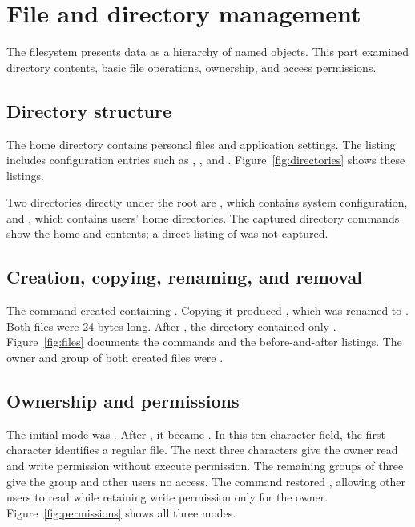 \documentclass{../latex/utmreport}
\begin{document}
\chapter{File and directory management}
The filesystem presents data as a hierarchy of named objects. This part
examined directory contents, basic file operations, ownership, and access
permissions.

\section{Directory structure}
The home directory contains personal files and application settings. The
 listing includes configuration entries such as
, , and .
Figure~\ref{fig:directories} shows these listings.

Two directories directly under the root are , which contains
system configuration, and , which contains users' home
directories. The captured directory commands show the home and
 contents; a direct listing of \code{/} was not captured.

\section{Creation, copying, renaming, and removal}
The command  created  containing
. Copying it produced , which
was renamed to . Both files were 24 bytes long.
After , the directory contained only .
Figure~\ref{fig:files} documents the commands and the before-and-after
listings. The owner and group of both created files were .

\section{Ownership and permissions}
The initial mode was . After
, it became . In this ten-character
field, the first character identifies a regular file. The next three characters
give the owner read and write permission without execute permission. The
remaining groups of three give the group and other users no access.
The command  restored , allowing
other users to read while retaining write permission only for the owner.
Figure~\ref{fig:permissions} shows all three modes.
\end{document}
